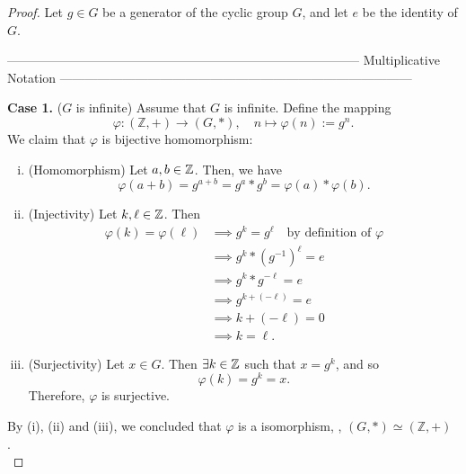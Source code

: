 \documentclass[11pt,openany]{article}
\begin{document}
\newpage
{}
\begin{proof}
	Let \( g \in G \) be a generator of the cyclic group \(G\), and let $e$ be the identity of $G$. \\
	\begin{center}
	\ttfamily ------------------------------------------------------------------------------------ Multiplicative Notation ------------------------------------------------------------------------------------
	\end{center}
	\textbf{Case 1.} ($G$ is infinite) Assume that $G$ is infinite. Define the mapping \[
	\varphi : (\mathbb{Z}, +) \to (G, \ast),\quad n\mapsto \varphi(n):=g^n.
	\] We claim that $\varphi$ is bijective homomorphism: \begin{enumerate}[(i)]
		\item (Homomorphism)\;  Let $a,b\in\mathbb{Z}$. Then, we have \[
		\varphi(a+b)=g^{a+b}=g^a\ast g^b = \varphi(a)\ast\varphi(b).
		\]
		\item (Injectivity)\; Let $k,\ell\in\mathbb{Z}$. Then \begin{align*}
			\varphi(k)=\varphi(\ell)&\implies g^k=g^\ell\quad\text{by definition of $\varphi$}\\
			&\implies g^k\ast (g^{-1})^{\ell}=e\\
			&\implies g^k\ast g^{-\ell}=e\\
			&\implies g^{k+(-\ell)}=e\\
			&\implies k+(-\ell) = 0 \\
			&\implies k=\ell.
		\end{align*}
		\item (Surjectivity)\; Let \(x\in G\). Then $\exists k\in \mathbb{Z}$ such that \(x=g^k\), and so \[
		\varphi(k)=g^k = x.
		\] Therefore, \(\varphi\) is surjective.
	\end{enumerate}
	By (i), (ii) and (iii), we concluded that \(\varphi\) is a isomorphism, \ie, $(G,\ast) \simeq (\mathbb{Z},+)$.\ \\

\end{proof}
\end{document}
